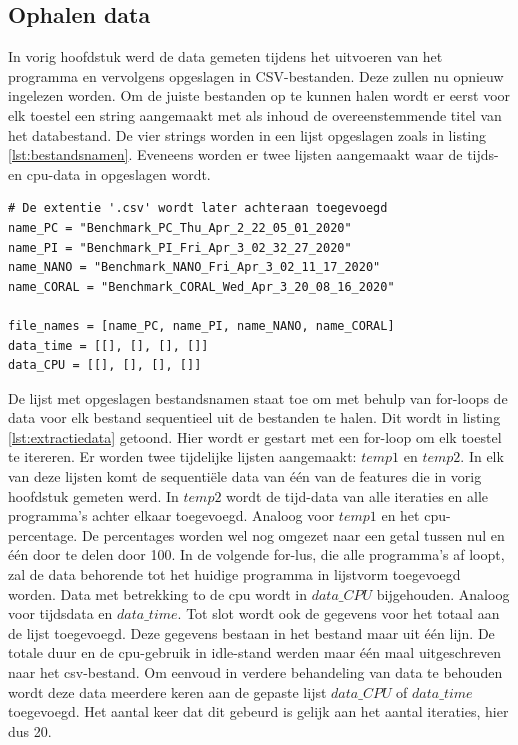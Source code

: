 	\subsection{Ophalen data}
	In vorig hoofdstuk werd de data gemeten tijdens het uitvoeren van het programma en vervolgens opgeslagen in CSV-bestanden. Deze zullen nu opnieuw ingelezen worden. Om de juiste bestanden op te kunnen halen wordt er eerst voor elk toestel een string aangemaakt met als inhoud de overeenstemmende titel van het databestand. De vier strings worden in een lijst opgeslagen zoals in listing \ref{lst:bestandsnamen}. Eveneens worden er twee lijsten aangemaakt waar de tijds- en \gls{cpu}-data in opgeslagen wordt.
	
	\begin{lstlisting}[caption={Bijhouden van databestandsnamen voor elk toestel.},captionpos=b, label = {lst:bestandsnamen}]
# De extentie '.csv' wordt later achteraan toegevoegd
name_PC = "Benchmark_PC_Thu_Apr_2_22_05_01_2020"
name_PI = "Benchmark_PI_Fri_Apr_3_02_32_27_2020"
name_NANO = "Benchmark_NANO_Fri_Apr_3_02_11_17_2020"
name_CORAL = "Benchmark_CORAL_Wed_Apr_3_20_08_16_2020"

file_names = [name_PC, name_PI, name_NANO, name_CORAL]
data_time = [[], [], [], []]
data_CPU = [[], [], [], []]
\end{lstlisting}	
		
	De lijst met opgeslagen bestandsnamen staat toe om met behulp van for-loops de data voor elk bestand sequentieel uit de bestanden te halen. Dit wordt in listing \ref{lst:extractiedata} getoond. Hier wordt er gestart met een for-loop om elk toestel te itereren. Er worden twee tijdelijke lijsten aangemaakt: $temp1$ en $temp2$. In elk van deze lijsten komt de sequenti\"ele data van \'e\'en van de features die in vorig hoofdstuk gemeten werd. In $temp2$ wordt de tijd-data van alle iteraties en alle programma's achter elkaar toegevoegd. Analoog voor $temp1$ en het \gls{cpu}-percentage. De percentages worden wel nog omgezet naar een getal tussen nul en \'e\'en door te delen door 100. In de volgende for-lus, die alle programma's af loopt, zal de data behorende tot het huidige programma in lijstvorm toegevoegd worden. Data met betrekking to de \gls{cpu} wordt in $data\_CPU$ bijgehouden. Analoog voor tijdsdata en $data\_time$. Tot slot wordt ook de gegevens voor het totaal aan de lijst toegevoegd. Deze gegevens bestaan in het bestand maar uit \'e\'en lijn. De totale duur en de \gls{cpu}-gebruik in idle-stand werden maar \'e\'en maal uitgeschreven naar het \gls{csv}-bestand. Om eenvoud in verdere behandeling van data te behouden wordt deze data meerdere keren aan de gepaste lijst $data\_CPU$ of $data\_time$ toegevoegd. Het aantal keer dat dit gebeurd is gelijk aan het aantal iteraties, hier dus 20.
 
